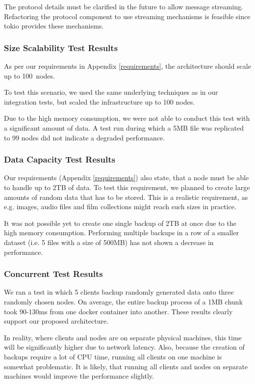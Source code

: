 The protocol details must be clarified in the future to allow \gls{message} streaming. Refactoring the protocol component to use streaming mechanisms is feasible since tokio provides these mechanisms\cite{tokio-streaming}.

\subsubsection{Size Scalability Test Results}
As per our requirements in Appendix \ref{requirements}, the architecture should scale up to 100~\glspl{node}.

To test this scenario, we used the same underlying techniques as in our integration tests, but scaled the infrastructure up to 100 \glspl{node}.

Due to the high memory consumption, we were not able to conduct this test with a significant amount of data. A test run during which a 5MB file was replicated to 99 \glspl{node} did not indicate a degraded performance.

\subsubsection{Data Capacity Test Results}
Our requirements (Appendix \ref{requirements}) also state, that a \gls{node} must be able to handle up to 2TB of data. To test this requirement, we planned to create large amounts of random data that has to be stored. This is a realistic requirement, as e.g. images, audio files and film collections might reach such sizes in practice.

It was not possible yet to create one single backup of 2TB at once due to the high memory consumption. Performing multiple backups in a row of a smaller dataset (i.e. 5 files with a size of 500MB) has not shown a decrease in performance.

\subsubsection{Concurrent Test Results}

We ran a test in which 5 \glspl{client} backup randomly generated data onto three randomly chosen \glspl{node}. On average, the entire backup process of a 1MB \gls{chunk} took 90-130ms from one docker container into another. These results clearly support our proposed architecture.

In reality, where \glspl{client} and \glspl{node} are on separate physical machines, this time will be significantly higher due to network latency. Also, because the creation of backups require a lot of CPU time, running all \glspl{client} on one machine is somewhat problematic. It is likely, that running all \glspl{client} and \glspl{node} on separate machines would improve the performance slightly.

